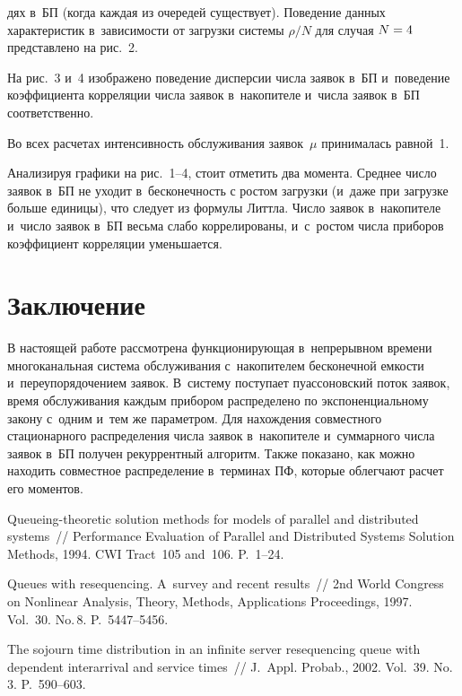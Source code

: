 \begin{multicols}{2}
\noindent
дях в~БП (когда каждая из очередей существует).
Поведение данных характеристик в~зависимости от загрузки системы
$\rho/N$ для случая $N\hm=4$ пред\-став\-ле\-но на рис.~2.

На рис.~3 и~4 изображено поведение дисперсии числа
заявок в~БП и~поведение
коэффициента корреляции числа заявок в~накопителе и~числа
заявок в~БП соответственно.

Во всех расчетах интенсивность обслуживания заявок~$\mu$ принималась
равной~1.


Анализируя графики на рис.~1--4, стоит отметить два момента. Среднее
число заявок в~БП не уходит в~бесконечность с ростом загрузки
(и~даже при загрузке больше единицы), что следует из формулы Литтла.
Число заявок в~накопителе и~число заявок в~БП весьма слабо
коррелированы, и~с~рос\-том числа приборов коэффициент корреляции
уменьшается.

\section{Заключение}

В настоящей работе рассмотрена функционирующая в~непрерывном времени
многоканальная система обслуживания с~накопителем бесконечной емкости
и~переупорядочением заявок.
В~систему поступает пуассоновский поток заявок, время
обслуживания каждым прибором распределено по
экспоненциальному закону с~одним и~тем же параметром.
Для нахождения совместного стационарного распределения
числа заявок в~накопителе и~суммарного числа
заявок в~БП получен рекуррентный алгоритм.
Также показано, как можно находить совместное распределение
в~терминах ПФ, которые облегчают расчет его моментов.

{\small\frenchspacing
 {%
 \begin{thebibliography}{99}
Queueing-theoretic solution methods for
models of parallel and distributed systems~//
Performance Evaluation of Parallel and Distributed Systems Solution
Methods, 1994. CWI Tract~105 and~106. P.~1--24.

Queues with resequencing. A~survey and recent results~//
{2nd World Congress on Nonlinear Analysis,
Theory, Methods, Applications Proceedings}, 1997. Vol.~30. No.\,8. P.~5447--5456.

The sojourn time distribution in an infinite server
resequencing queue with dependent interarrival and
service times~// J.~Appl. Probab., 2002.
Vol.~39. No.\,3. P.~590--603.


\end{thebibliography}}}
\end{multicols}

